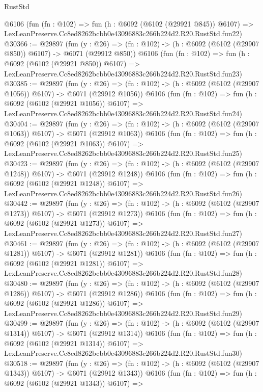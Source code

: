 \begin{lexlean}{RustStd}
\begin{coremodule}
    @6106
    (fun (fn : @102) =>
    fun (h : @6092 (@6102 (@29921 @845)) @6107) =>
    LexLeanPreserve.Cc8ed8262bcbb0e43096883c266b224d2.R20.RustStd.fun22)
@30366 := @29897
    (fun (y : @26) => (fn : @102) -> (h : @6092 (@6102 (@29907 @850)) @6107) -> @6071 (@29912 @850))
    @6106
    (fun (fn : @102) =>
    fun (h : @6092 (@6102 (@29921 @850)) @6107) =>
    LexLeanPreserve.Cc8ed8262bcbb0e43096883c266b224d2.R20.RustStd.fun23)
@30385 := @29897
    (fun (y : @26) =>
    (fn : @102) -> (h : @6092 (@6102 (@29907 @1056)) @6107) -> @6071 (@29912 @1056))
    @6106
    (fun (fn : @102) =>
    fun (h : @6092 (@6102 (@29921 @1056)) @6107) =>
    LexLeanPreserve.Cc8ed8262bcbb0e43096883c266b224d2.R20.RustStd.fun24)
@30404 := @29897
    (fun (y : @26) =>
    (fn : @102) -> (h : @6092 (@6102 (@29907 @1063)) @6107) -> @6071 (@29912 @1063))
    @6106
    (fun (fn : @102) =>
    fun (h : @6092 (@6102 (@29921 @1063)) @6107) =>
    LexLeanPreserve.Cc8ed8262bcbb0e43096883c266b224d2.R20.RustStd.fun25)
@30423 := @29897
    (fun (y : @26) =>
    (fn : @102) -> (h : @6092 (@6102 (@29907 @1248)) @6107) -> @6071 (@29912 @1248))
    @6106
    (fun (fn : @102) =>
    fun (h : @6092 (@6102 (@29921 @1248)) @6107) =>
    LexLeanPreserve.Cc8ed8262bcbb0e43096883c266b224d2.R20.RustStd.fun26)
@30442 := @29897
    (fun (y : @26) =>
    (fn : @102) -> (h : @6092 (@6102 (@29907 @1273)) @6107) -> @6071 (@29912 @1273))
    @6106
    (fun (fn : @102) =>
    fun (h : @6092 (@6102 (@29921 @1273)) @6107) =>
    LexLeanPreserve.Cc8ed8262bcbb0e43096883c266b224d2.R20.RustStd.fun27)
@30461 := @29897
    (fun (y : @26) =>
    (fn : @102) -> (h : @6092 (@6102 (@29907 @1281)) @6107) -> @6071 (@29912 @1281))
    @6106
    (fun (fn : @102) =>
    fun (h : @6092 (@6102 (@29921 @1281)) @6107) =>
    LexLeanPreserve.Cc8ed8262bcbb0e43096883c266b224d2.R20.RustStd.fun28)
@30480 := @29897
    (fun (y : @26) =>
    (fn : @102) -> (h : @6092 (@6102 (@29907 @1286)) @6107) -> @6071 (@29912 @1286))
    @6106
    (fun (fn : @102) =>
    fun (h : @6092 (@6102 (@29921 @1286)) @6107) =>
    LexLeanPreserve.Cc8ed8262bcbb0e43096883c266b224d2.R20.RustStd.fun29)
@30499 := @29897
    (fun (y : @26) =>
    (fn : @102) -> (h : @6092 (@6102 (@29907 @1314)) @6107) -> @6071 (@29912 @1314))
    @6106
    (fun (fn : @102) =>
    fun (h : @6092 (@6102 (@29921 @1314)) @6107) =>
    LexLeanPreserve.Cc8ed8262bcbb0e43096883c266b224d2.R20.RustStd.fun30)
@30518 := @29897
    (fun (y : @26) =>
    (fn : @102) -> (h : @6092 (@6102 (@29907 @1343)) @6107) -> @6071 (@29912 @1343))
    @6106
    (fun (fn : @102) =>
    fun (h : @6092 (@6102 (@29921 @1343)) @6107) =>

\end{coremodule}
\end{lexlean}
